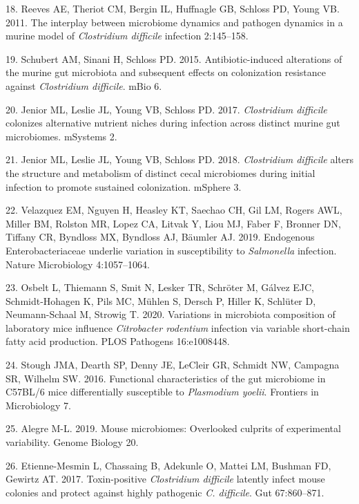 \documentclass[11pt,]{article}
\begin{document}
\hypertarget{ref-Reeves2011}{}
18. Reeves AE, Theriot CM, Bergin IL, Huffnagle GB, Schloss PD, Young
VB. 2011. The interplay between microbiome dynamics and pathogen
dynamics in a murine model of \emph{Clostridium difficile} infection
2:145--158.

\hypertarget{ref-Schubert2015}{}
19. Schubert AM, Sinani H, Schloss PD. 2015. Antibiotic-induced
alterations of the murine gut microbiota and subsequent effects on
colonization resistance against \emph{Clostridium difficile}. mBio 6.

\hypertarget{ref-Jenior2017}{}
20. Jenior ML, Leslie JL, Young VB, Schloss PD. 2017. \emph{Clostridium
difficile} colonizes alternative nutrient niches during infection across
distinct murine gut microbiomes. mSystems 2.

\hypertarget{ref-Jenior2018}{}
21. Jenior ML, Leslie JL, Young VB, Schloss PD. 2018. \emph{Clostridium
difficile} alters the structure and metabolism of distinct cecal
microbiomes during initial infection to promote sustained colonization.
mSphere 3.

\hypertarget{ref-Velazquez2019}{}
22. Velazquez EM, Nguyen H, Heasley KT, Saechao CH, Gil LM, Rogers AWL,
Miller BM, Rolston MR, Lopez CA, Litvak Y, Liou MJ, Faber F, Bronner DN,
Tiffany CR, Byndloss MX, Byndloss AJ, Bäumler AJ. 2019. Endogenous
Enterobacteriaceae underlie variation in susceptibility to
\emph{Salmonella} infection. Nature Microbiology 4:1057--1064.

\hypertarget{ref-Osbelt2020}{}
23. Osbelt L, Thiemann S, Smit N, Lesker TR, Schröter M, Gálvez EJC,
Schmidt-Hohagen K, Pils MC, Mühlen S, Dersch P, Hiller K, Schlüter D,
Neumann-Schaal M, Strowig T. 2020. Variations in microbiota composition
of laboratory mice influence \emph{Citrobacter rodentium} infection via
variable short-chain fatty acid production. PLOS Pathogens 16:e1008448.

\hypertarget{ref-Stough2016}{}
24. Stough JMA, Dearth SP, Denny JE, LeCleir GR, Schmidt NW, Campagna
SR, Wilhelm SW. 2016. Functional characteristics of the gut microbiome
in C57BL/6 mice differentially susceptible to \emph{Plasmodium yoelii}.
Frontiers in Microbiology 7.

\hypertarget{ref-Alegre2019}{}
25. Alegre M-L. 2019. Mouse microbiomes: Overlooked culprits of
experimental variability. Genome Biology 20.

\hypertarget{ref-EtienneMesmin2017}{}
26. Etienne-Mesmin L, Chassaing B, Adekunle O, Mattei LM, Bushman FD,
Gewirtz AT. 2017. Toxin-positive \emph{Clostridium difficile} latently
infect mouse colonies and protect against highly pathogenic \emph{C.
difficile}. Gut 67:860--871.
\end{document}
